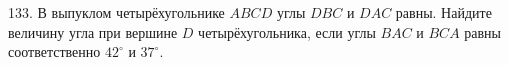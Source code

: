133. В выпуклом четырёхугольнике $ABCD$ углы $DBC$ и $DAC$ равны. Найдите величину угла при вершине $D$ четырёхугольника, если углы $BAC$ и $BCA$ равны соответственно $42^\circ$ и $37^\circ.$\\
